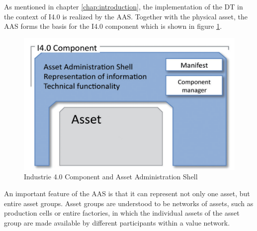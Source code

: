 As mentioned in chapter \ref{chap:introduction}, the implementation of the \ac{DT} in the context of \ac{I4.0} is realized by the \ac{AAS}. Together with the physical asset, the \ac{AAS} forms the basis for the \ac{I4.0} component which is shown in figure \ref{fig:i40component}.

\begin{figure}[h]
\centering
\includegraphics[scale=0.8]{content/pictures/i_40_component_zvei.png}
\caption{Industrie 4.0 Component and Asset Administration Shell}
\label{fig:i40component}
\end{figure}


An important feature of the \ac{AAS} is that it can represent not only one asset, but entire asset groups. Asset groups are understood to be networks of assets, such as production cells or entire factories, in which the individual assets of the asset group are made available by different participants within a value network.











